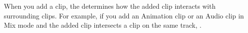 When you add a clip, the  determines how the added clip interacts with surrounding clips. For example, if you add an Animation clip or an Audio clip in Mix mode and the added clip intersects a clip on the same track,  . 